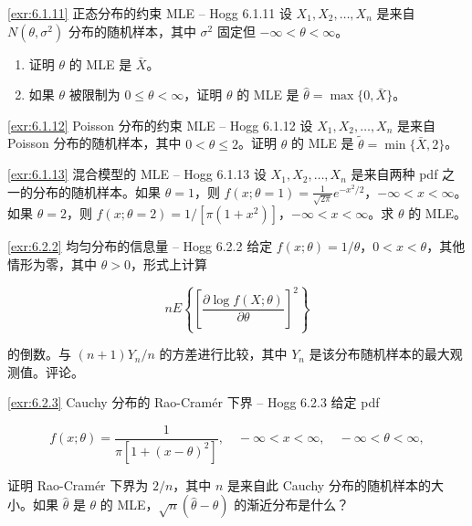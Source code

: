 \begin{exercise}{\ref{exr:6.1.11} 正态分布的约束 MLE – Hogg 6.1.11}\label{exr:6.1.11}
设 $X_1, X_2, \ldots, X_n$ 是来自 $N(\theta, \sigma^2)$ 分布的随机样本，其中 $\sigma^2$ 固定但 $-\infty < \theta < \infty$。

\begin{enumerate}
\item[(a)] 证明 $\theta$ 的 MLE 是 $\bar{X}$。
\item[(b)] 如果 $\theta$ 被限制为 $0 \leq \theta < \infty$，证明 $\theta$ 的 MLE 是 $\widehat{\theta} = \max\{0, \bar{X}\}$。
\end{enumerate}
\end{exercise}

\begin{exercise}{\ref{exr:6.1.12} Poisson 分布的约束 MLE – Hogg 6.1.12}\label{exr:6.1.12}
设 $X_1, X_2, \ldots, X_n$ 是来自 Poisson 分布的随机样本，其中 $0 < \theta \leq 2$。证明 $\theta$ 的 MLE 是 $\widetilde{\theta} = \min\{\bar{X}, 2\}$。
\end{exercise}

\begin{exercise}{\ref{exr:6.1.13} 混合模型的 MLE – Hogg 6.1.13}\label{exr:6.1.13}
设 $X_1, X_2, \ldots, X_n$ 是来自两种 pdf 之一的分布的随机样本。如果 $\theta=1$，则 $f(x;\theta=1) = \frac{1}{\sqrt{2\pi}}e^{-x^2/2}$，$-\infty < x < \infty$。如果 $\theta=2$，则 $f(x;\theta=2) = 1/[\pi(1+x^2)]$，$-\infty < x < \infty$。求 $\theta$ 的 MLE。
\end{exercise}


\begin{exercise}{\ref{exr:6.2.2} 均匀分布的信息量 – Hogg 6.2.2}\label{exr:6.2.2}
给定 $f(x;\theta) = 1/\theta$，$0 < x < \theta$，其他情形为零，其中 $\theta > 0$，形式上计算

\[
n E\left\{\left[ \frac{\partial \log f(X;\theta)}{\partial \theta} \right]^2\right\}
\]

的倒数。与 $(n+1)Y_n/n$ 的方差进行比较，其中 $Y_n$ 是该分布随机样本的最大观测值。评论。
\end{exercise}

\begin{exercise}{\ref{exr:6.2.3} Cauchy 分布的 Rao-Cramér 下界 – Hogg 6.2.3}\label{exr:6.2.3}
给定 pdf

\[
f(x;\theta) = \frac{1}{\pi[1+(x-\theta)^2]}, \quad -\infty < x < \infty, \quad -\infty < \theta < \infty,
\]

证明 Rao-Cramér 下界为 $2/n$，其中 $n$ 是来自此 Cauchy 分布的随机样本的大小。如果 $\widehat{\theta}$ 是 $\theta$ 的 MLE，$\sqrt{n}(\widehat{\theta}-\theta)$ 的渐近分布是什么？
\end{exercise}

